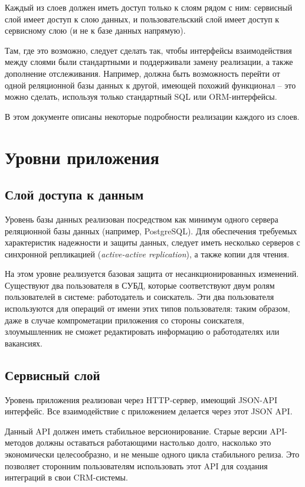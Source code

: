 \documentclass[a4page]{article}
\begin{document}
Каждый из слоев должен иметь доступ только к слоям рядом с ним:
сервисный слой имеет доступ к слою данных,
и пользовательский слой имеет доступ к сервисному слою
(и не к базе данных напрямую).

Там, где это возможно, следует сделать так, чтобы интерфейсы взаимодействия между слоями
были стандартными и поддерживали замену реализации, а также дополнение отслеживания.
Например, должна быть возможность перейти от одной реляционной базы данных к другой,
имеющей похожий функционал --
это можно сделать, используя только стандартный SQL или ORM-интерфейсы.

В этом документе описаны некоторые подробности реализации каждого из слоев. 

\newpage
\section{Уровни приложения}

\subsection{Слой доступа к данным}

Уровень базы данных реализован посредством как минимум
одного сервера реляционной базы данных (например, PostgreSQL).
Для обеспечения требуемых характеристик надежности и защиты данных,
следует иметь несколько серверов с синхронной репликацией (\textit{active-active replication}),
а также копии для чтения.

На этом уровне реализуется базовая защита от несанкционированных изменений.
Существуют два пользователя в СУБД, которые соответствуют двум ролям пользователей в системе: работодатель и соискатель.
Эти два пользователя используются для операций от имени этих типов пользователя:
таким образом, даже в случае компрометации приложения со стороны соискателя,
злоумышленник не сможет редактировать информацию о работодателях или вакансиях.

\subsection{Сервисный слой}

Уровень приложения реализован через HTTP-сервер, имеющий JSON-API интерфейс.
Все взаимодействие с приложением делается через этот JSON API.

Данный API должен иметь стабильное версионирование.
Старые версии API-методов должны оставаться работающими
настолько долго, насколько это экономически целесообразно,
и не меньше одного цикла стабильного релиза.
Это позволяет сторонним пользователям использовать этот API
для создания интеграций в свои CRM-системы.
\end{document}
